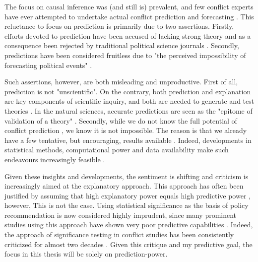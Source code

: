 \documentclass[a4paper]{article}
\begin{document}
The focus on causal inference was (and still is) prevalent, and few conflict experts have ever attempted to undertake actual conflict prediction and forecasting \citep[474]{cederman2017predicting}. This reluctance to focus on prediction is primarily due to two assertions. Firstly, efforts devoted to prediction have been accused of lacking strong theory and as a consequence been rejected by traditional political science journals \citep[8-9]{chadefaux2017conflict}. Secondly, predictions have been considered fruitless due to "the perceived impossibility of forecasting political events" \citep[8]{chadefaux2017conflict}.

Such assertions, however, are both misleading and unproductive. First of all, prediction is not "unscientific". On the contrary, both prediction and explanation are key components of scientific inquiry, and both are needed to generate and test theories \citep[8]{chadefaux2017conflict}. In the natural sciences, accurate predictions are seen as the "epitome of validation of a theory" \citep[289]{Schrodt_2014}. Secondly, while we do not know the full potential of conflict prediction \citep{cederman2017predicting, chadefaux2017conflict}, we know it is not impossible. The reason is that we already have a few tentative, but encouraging, results available \citep{Goldstone_2010, perry_2013, mueller_2016, Maase}. Indeed, developments in statistical methods, computational power and data availability make such endeavours increasingly feasible \citep{ol2010afghanistan, perry_2013}.\par

Given these insights and developments, the sentiment is shifting and criticism is increasingly aimed at the explanatory approach. This approach has often been justified by assuming that high explanatory power equals high predictive power \citep[8]{chadefaux2017conflict}, however, This is not the case. Using statistical significance as the basis of policy recommendation is now considered highly imprudent, since many prominent studies using this approach have shown very poor predictive capabilities \citep{Ward_Greenhill_Bakke_2010, Schrodt_2014, chadefaux2017conflict}. Indeed, the approach of significance testing in conflict studies has been consistently criticized for almost two decades \citep{king_zeng_2001b, Ward_Greenhill_Bakke_2010, Goldstone_2010, Schrodt_2014, chadefaux2017conflict}. Given this critique and my predictive goal, the focus in this thesis will be solely on prediction-power.\par
\end{document}
